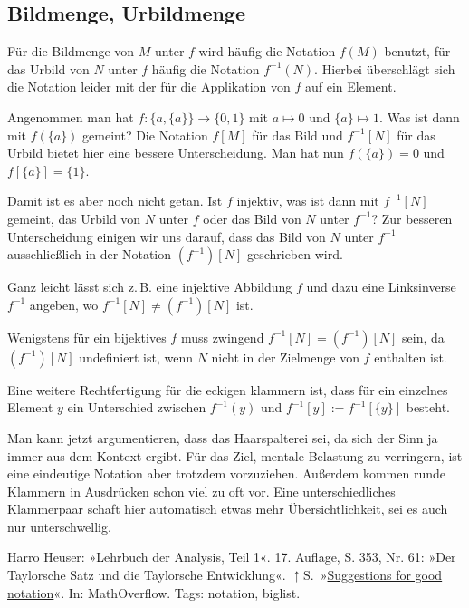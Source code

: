 \documentclass[a4paper,11pt,fleqn,twoside,BCOR=16mm]{scrartcl}
\begin{document}
\subsection{Bildmenge, Urbildmenge}

Für die Bildmenge von $M$ unter $f$ wird häufig die Notation $f(M)$
benutzt, für das Urbild von $N$ unter $f$ häufig die
Notation $f^{-1}(N)$. Hierbei überschlägt sich die Notation leider mit
der für die Applikation von $f$ auf ein Element.

Angenommen man hat $f\colon \{a,\{a\}\}\to\{0,1\}$ mit $a\mapsto 0$ und
$\{a\}\mapsto 1$. Was ist dann mit $f(\{a\})$ gemeint? Die Notation
$f[M]$ für das Bild und $f^{-1}[N]$ für das Urbild bietet hier eine
bessere Unterscheidung. Man hat nun $f(\{a\})=0$ und
$f[\{a\}]=\{1\}$.

Damit ist es aber noch nicht getan. Ist $f$ injektiv,
was ist dann mit $f^{-1}[N]$ gemeint, das Urbild
von $N$ unter $f$ oder das Bild von $N$ unter $f^{-1}$? Zur besseren
Unterscheidung einigen wir uns darauf, dass das Bild von $N$
unter $f^{-1}$ ausschließlich in der Notation $(f^{-1})[N]$
geschrieben wird.

Ganz leicht lässt sich z.\,B. eine injektive Abbildung $f$ und dazu
eine Linksinverse $f^{-1}$ angeben, wo $f^{-1}[N]\ne (f^{-1})[N]$ ist.

Wenigstens für ein bijektives $f$ muss zwingend
$f^{-1}[N]=(f^{-1})[N]$ sein, da $(f^{-1})[N]$ undefiniert ist,
wenn $N$ nicht in der Zielmenge von $f$ enthalten ist.

Eine weitere Rechtfertigung für die eckigen klammern ist,
dass für ein einzelnes Element $y$ ein Unterschied
zwischen $f^{-1}(y)$ und $f^{-1}[y]:=f^{-1}[\{y\}]$
besteht.

Man kann jetzt argumentieren, dass das Haarspalterei sei,
da sich der Sinn ja immer aus dem Kontext ergibt. Für das Ziel,
mentale Belastung zu verringern, ist eine eindeutige Notation
aber trotzdem vorzuziehen. Außerdem kommen runde Klammern in
Ausdrücken schon viel zu oft vor. Eine unterschiedliches Klammerpaar
schaft hier automatisch etwas mehr Übersichtlichkeit, sei es
auch nur unterschwellig.

\begin{thebibliography}{xx}
 Harro Heuser: »Lehrbuch der Analysis, Teil 1«.
  17. Auflage, S. 353, Nr. 61: »Der Taylorsche Satz und die Taylorsche
  Entwicklung«. $\uparrow$S.\,\pageref{bref:Heuser}
»\href{https://mathoverflow.net/questions/42929/suggestions-for-good-notation}%
{Suggestions for good notation}«.
  In: MathOverflow. Tags: notation, biglist.
\end{thebibliography}
\end{document}
